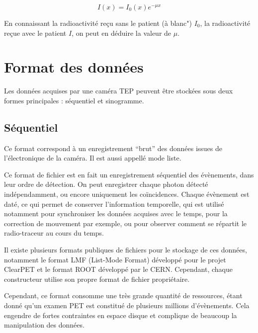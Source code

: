 \begin{equation}
I(x) = I_0(x) e^{-\mu x}
\end{equation}

En connaissant la radioactivité reçu sans le patient (à blanc") $I_0$, la radioactivité reçue avec le patient $I$, on peut en déduire la valeur de $\mu$.




	\section{Format des données}
Les données acquises par une caméra TEP peuvent être stockées sous deux formes principales : séquentiel et sinogramme.

		\subsection{Séquentiel}
\label{lab:modeliste}
Ce format correspond à un enregistrement ``brut'' des données issues de l'électronique de la caméra. Il est aussi appellé mode liste.

Ce format de fichier est en fait un enregistrement séquentiel des évènements, dans leur ordre de détection. On peut enregistrer chaque photon détecté indépendamment, ou encore uniquement les coïncidences. Chaque évènement est daté, ce qui permet de conserver l’information temporelle, qui est utilisé notamment pour synchroniser les données acquises avec le temps, pour la correction de mouvement par exemple, ou pour observer comment se répartit le radio-traceur au cours du temps.

Il existe plusieurs formats publiques de fichiers pour le stockage de ces données, notamment le format LMF (List-Mode Format) développé pour le projet ClearPET et le format ROOT développé par le CERN. Cependant, chaque constructeur utilise son propre format de fichier propriétaire.


Cependant, ce format consomme une très grande quantité de ressources, étant donné qu'un examen PET est constitué de plusieurs millions d'évènements. Cela engendre de fortes contraintes en espace disque et complique de beaucoup la manipulation des données. 

